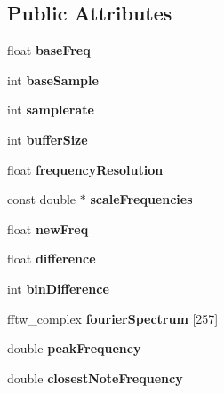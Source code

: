 \subsection*{Public Attributes}
\begin{DoxyCompactItemize}
\item 
\hypertarget{classVocoder_a47e8c37097fafbe8bd8a87adba84e5f1}{float {\bfseries base\-Freq}}\label{classVocoder_a47e8c37097fafbe8bd8a87adba84e5f1}

\item 
\hypertarget{classVocoder_ad4f1e12813090bb2a980be7aa3bac471}{int {\bfseries base\-Sample}}\label{classVocoder_ad4f1e12813090bb2a980be7aa3bac471}

\item 
\hypertarget{classVocoder_a7fa47ae2edf71aeb5b36e875bb440667}{int {\bfseries samplerate}}\label{classVocoder_a7fa47ae2edf71aeb5b36e875bb440667}

\item 
\hypertarget{classVocoder_a38c9aa4fad739f7577e51fc3d4891751}{int {\bfseries buffer\-Size}}\label{classVocoder_a38c9aa4fad739f7577e51fc3d4891751}

\item 
\hypertarget{classVocoder_a5bd2da8b9a6b618be7828035dfb50f53}{float {\bfseries frequency\-Resolution}}\label{classVocoder_a5bd2da8b9a6b618be7828035dfb50f53}

\item 
\hypertarget{classVocoder_a2cf377a9138da30b22b273f55915ea65}{const double $\ast$ {\bfseries scale\-Frequencies}}\label{classVocoder_a2cf377a9138da30b22b273f55915ea65}

\item 
\hypertarget{classVocoder_a77dcc19311b4905125bf609084b4ad2a}{float {\bfseries new\-Freq}}\label{classVocoder_a77dcc19311b4905125bf609084b4ad2a}

\item 
\hypertarget{classVocoder_a300f616506453a971cf21a7de35e2964}{float {\bfseries difference}}\label{classVocoder_a300f616506453a971cf21a7de35e2964}

\item 
\hypertarget{classVocoder_acd33a5938c9167429b2a4cd8c58374ae}{int {\bfseries bin\-Difference}}\label{classVocoder_acd33a5938c9167429b2a4cd8c58374ae}

\item 
\hypertarget{classVocoder_a2884b2fe7d5303609ddeff6979bdbcd3}{fftw\-\_\-complex {\bfseries fourier\-Spectrum} \mbox{[}257\mbox{]}}\label{classVocoder_a2884b2fe7d5303609ddeff6979bdbcd3}

\item 
\hypertarget{classVocoder_abae7bb20fa180d030d6a96f08af48429}{double {\bfseries peak\-Frequency}}\label{classVocoder_abae7bb20fa180d030d6a96f08af48429}

\item 
\hypertarget{classVocoder_a6550fbf8de5847c7d5a6fcb90b4f3c2b}{double {\bfseries closest\-Note\-Frequency}}\label{classVocoder_a6550fbf8de5847c7d5a6fcb90b4f3c2b}

\end{DoxyCompactItemize}



